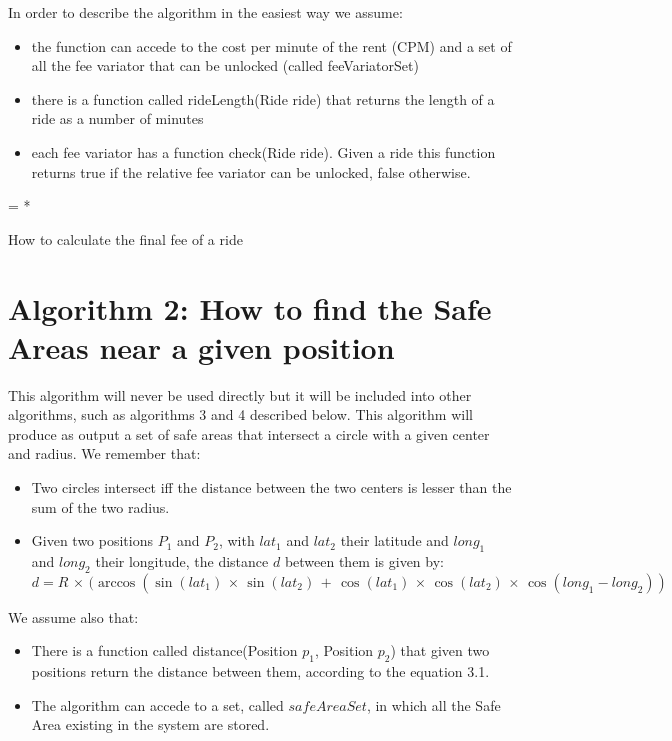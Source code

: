 In order to describe the algorithm in the easiest way we assume:
\begin{itemize}
\item the function can accede to the cost per minute of the rent (CPM) and a set of all the fee variator that can be unlocked (called feeVariatorSet)
\item there is a function called rideLength(Ride ride) that returns the length of a ride as a number of minutes
\item each fee variator has a function check(Ride ride). Given a ride this function returns true if the relative fee variator can be unlocked, false otherwise.
\end{itemize}

\begin{algorithm}[H]


	\BlankLine
{}
	\BlankLine
\Res = \RL{\Ride} * \cpm\;
	\BlankLine
{}
\Return \Res \;
\caption{How to calculate the final fee of a ride}
\end{algorithm}

\section{Algorithm 2: How to find the Safe Areas near a given position}
This algorithm will never be used directly but it will be included into other algorithms, such as algorithms 3 and 4 described below. 
This algorithm will produce as output a set of safe areas that intersect a circle with a given center and radius.
We remember that:
\begin{itemize}
\item Two circles intersect iff the distance between the two centers is lesser than the sum of the two radius.
\item Given two positions $P_{1}$ and $P_{2}$, with $lat_{1}$ and $lat_{2}$ their latitude and $long_{1}$ and $long_{2}$ their longitude, the distance $d$ between them is given by:
\begin{equation}
d = R\,\times\,(\arccos (\sin (lat_{1})\, \times\, \sin (lat_{2})\, +\, \cos (lat_{1})\, \times\, \cos (lat_{2})\, \times\, \cos(long_{1} - long_{2}))
\end{equation}
\end{itemize}
We assume also that:
\begin{itemize}
\item There is a function called distance(Position $p_{1}$, Position $p_{2}$) that given two positions return the distance between them, according to the equation 3.1.
\item The algorithm can accede to a set, called $safeAreaSet$, in which all the Safe Area existing in the system are stored.
\end{itemize}

